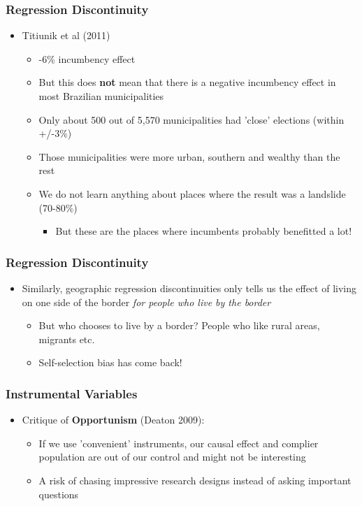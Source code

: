 \documentclass[xcolor=x11names,compress]{beamer}\usepackage[]{graphicx}\usepackage[]{color}
\renewcommand{\(}{\begin{columns}}
\renewcommand{\)}{\end{columns}}
\newcommand{\<}[1]{\begin{column}{#1}}
\renewcommand{\>}{\end{column}}
\begin{document}
\begin{frame}
\frametitle{Regression Discontinuity}
\begin{itemize}
\item Titiunik et al (2011) 
\pause
\begin{itemize}
\item -6\% incumbency effect
\pause
\item But this does \textbf{not} mean that there is a negative incumbency effect in most Brazilian municipalities
\pause
\item Only about 500 out of 5,570 municipalities had 'close' elections (within +/-3\%)
\pause
\item Those municipalities were more urban, southern and wealthy than the rest
\pause
\item We do not learn anything about places where the result was a landslide (70-80\%)
\pause
\begin{itemize}
\item But these are the places where incumbents probably benefitted a lot!
\end{itemize}
\end{itemize}
\end{itemize}
\end{frame}

\begin{frame}
\frametitle{Regression Discontinuity}
\begin{itemize}
\item Similarly, geographic regression discontinuities only tells us the effect of living on one side of the border \textit{for people who live by the border}
\pause
\begin{itemize}
\item But who chooses to live by a border? People who like rural areas, migrants etc.
\pause
\item Self-selection bias has come back!
\end{itemize}
\end{itemize}
\end{frame}

\begin{frame}
\frametitle{Instrumental Variables}
\begin{itemize}
\item Critique of \textbf{Opportunism} (Deaton 2009):
\pause
\begin{itemize}
\item If we use 'convenient' instruments, our causal effect and complier population are out of our control and might not be interesting
\pause
\item A risk of chasing impressive research designs instead of asking important questions
\end{itemize}
\end{itemize}
\end{frame}
\end{document}
